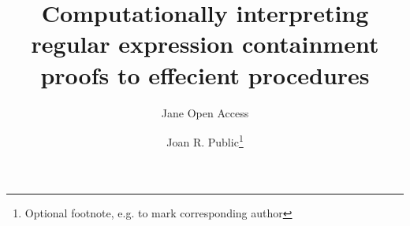 \documentclass[a4paper,UKenglish,cleveref, autoref, thm-restate]{lipics-v2021}
\title{Computationally interpreting regular expression containment proofs to effecient procedures } %
\author{Jane {Open Access}}{Dummy University Computing Laboratory, [optional: Address], Country \and My second affiliation, Country \and \url{http://www.myhomepage.edu} }{johnqpublic@dummyuni.org}{https://orcid.org/0000-0002-1825-0097}{(Optional) author-specific funding acknowledgements}%
\author{Joan R. Public\footnote{Optional footnote, e.g. to mark corresponding author}}{Department of Informatics, Dummy College, [optional: Address], Country}{joanrpublic@dummycollege.org}{[orcid]}{[funding]}
\begin{document}


\maketitle

\begin{abstract}
\end{abstract}

\end{document}
